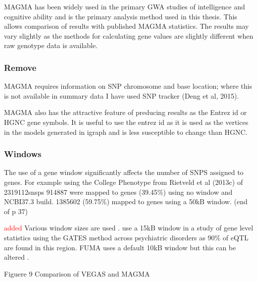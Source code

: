MAGMA has been widely used in the primary GWA studies of intelligence and cognitive ability and is the primary analysis method used in this thesis. This allows comparison of results with published MAGMA statistics. The results may vary slightly as the methods for calculating gene values are slightly different when raw genotype data is available. 

\subsubsection{Remove}
MAGMA requires information on SNP chromosome and base location; where this is not available in summary data I have used SNP tracker (Deng et al, 2015).

MAGMA also has the attractive feature of preducing results as the Entrez id or HGNC gene symbols. It is useful to use the entrez id as it is used as the vertices in the models generated in igraph and is less susceptible to change than HGNC.
\subsubsection{Windows}
\label{sec:windows1}
The use of a gene window significantly affects the number of SNPS assigned to genes. For example using the College Phenotype from Rietveld et al (2013c) of 2319112snsps 914887 were mapped to genes (39.45\%) using no window and NCBI37.3 build. 1385602 (59.75\%) mapped to genes using a 50kB window. (end of p 37)

\textcolor{red}{added}
Various window sizes are used . \cite{zhao2017gene} use a 15kB window in a study of gene level statistics using the GATES method \cite{li2011gates} across psychiatric disorders as 90\% \cite{pickrell2010understanding} of eQTL are found in this region. 
FUMA uses a default 10kB window but this can be altered \cite{watanabe2017functional}. 
 
Figuere 9 Comparison of VEGAS and MAGMA


